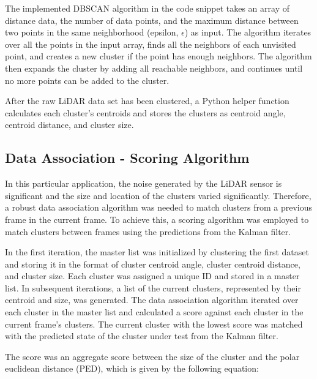 \documentclass[journal]{IEEEtran} %
\begin{document}
The implemented DBSCAN algorithm in the code snippet takes an array of distance data, the number of data points, and the maximum distance between two points in the same neighborhood (epsilon, $\epsilon$) as input. The algorithm iterates over all the points in the input array, finds all the neighbors of each unvisited point, and creates a new cluster if the point has enough neighbors. The algorithm then expands the cluster by adding all reachable neighbors, and continues until no more points can be added to the cluster.

After the raw LiDAR data set has been clustered, a Python helper function calculates each cluster's centroids and stores the clusters as centroid angle, centroid distance, and cluster size. 

\subsection{Data Association - Scoring Algorithm}

In this particular application, the noise generated by the LiDAR sensor is significant and the size and location of the clusters varied significantly. Therefore, a robust data association algorithm was needed to match clusters from a previous frame in the current frame. To achieve this, a scoring algorithm was employed to match clusters between frames using the predictions from the Kalman filter.

In the first iteration, the master list was initialized by clustering the first dataset and storing it in the format of cluster centroid angle, cluster centroid distance, and cluster size. Each cluster was assigned a unique ID and stored in a master list. In subsequent iterations, a list of the current clusters, represented by their centroid and size, was generated. The data association algorithm iterated over each cluster in the master list and calculated a score against each cluster in the current frame's clusters. The current cluster with the lowest score was matched with the predicted state of the cluster under test from the Kalman filter.

The score was an aggregate score between the size of the cluster and the polar euclidean distance (PED), which is given by the following equation:
\end{document}
